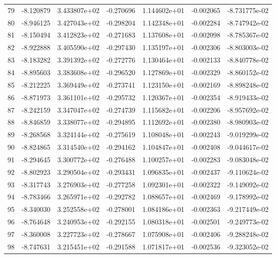 \begin{tabular}{rrrrrrr}
  79 &  -8.120879 &  3.433807e+02 & -0.270696 &  1.144602e+01 &   -0.002065 & -8.731775e-02 \\
  80 &  -8.946125 &  3.427043e+02 & -0.298204 &  1.142348e+01 &   -0.002284 & -8.747942e-02 \\
  81 &  -8.150494 &  3.412823e+02 & -0.271683 &  1.137608e+01 &   -0.002098 & -8.785367e-02 \\
  82 &  -8.922888 &  3.405590e+02 & -0.297430 &  1.135197e+01 &   -0.002306 & -8.803003e-02 \\
  83 &  -8.183282 &  3.391392e+02 & -0.272776 &  1.130464e+01 &   -0.002133 & -8.840778e-02 \\
  84 &  -8.895603 &  3.383608e+02 & -0.296520 &  1.127869e+01 &   -0.002329 & -8.860152e-02 \\
  85 &  -8.212225 &  3.369449e+02 & -0.273741 &  1.123150e+01 &   -0.002169 & -8.898248e-02 \\
  86 &  -8.871973 &  3.361101e+02 & -0.295732 &  1.120367e+01 &   -0.002354 & -8.919433e-02 \\
  87 &  -8.242159 &  3.347047e+02 & -0.274739 &  1.115682e+01 &   -0.002206 & -8.957692e-02 \\
  88 &  -8.846859 &  3.338077e+02 & -0.294895 &  1.112692e+01 &   -0.002380 & -8.980903e-02 \\
  89 &  -8.268568 &  3.324144e+02 & -0.275619 &  1.108048e+01 &   -0.002243 & -9.019299e-02 \\
  90 &  -8.824865 &  3.314540e+02 & -0.294162 &  1.104847e+01 &   -0.002408 & -9.044617e-02 \\
  91 &  -8.294645 &  3.300772e+02 & -0.276488 &  1.100257e+01 &   -0.002283 & -9.083048e-02 \\
  92 &  -8.802923 &  3.290504e+02 & -0.293431 &  1.096835e+01 &   -0.002437 & -9.110624e-02 \\
  93 &  -8.317743 &  3.276903e+02 & -0.277258 &  1.092301e+01 &   -0.002322 & -9.149092e-02 \\
  94 &  -8.783466 &  3.265971e+02 & -0.292782 &  1.088657e+01 &   -0.002469 & -9.178992e-02 \\
  95 &  -8.340030 &  3.252558e+02 & -0.278001 &  1.084186e+01 &   -0.002363 & -9.217449e-02 \\
  96 &  -8.764648 &  3.240953e+02 & -0.292155 &  1.080318e+01 &   -0.002501 & -9.249773e-02 \\
  97 &  -8.360008 &  3.227723e+02 & -0.278667 &  1.075908e+01 &   -0.002406 & -9.288248e-02 \\
  98 &  -8.747631 &  3.215451e+02 & -0.291588 &  1.071817e+01 &   -0.002536 & -9.323052e-02 \\

\end{tabular}
